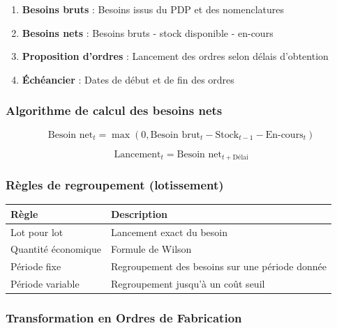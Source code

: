 \documentclass{article}
\begin{document}
\begin{table}[h]
\begin{tcolorbox}[colback=blueclair, colframe=blue!70!black, title=Principe du calcul MRP]
\begin{enumerate}
    \item \textbf{Besoins bruts} : Besoins issus du PDP et des nomenclatures
    \item \textbf{Besoins nets} : Besoins bruts - stock disponible - en-cours
    \item \textbf{Proposition d'ordres} : Lancement des ordres selon délais d'obtention
    \item \textbf{Échéancier} : Dates de début et de fin des ordres
\end{enumerate}
\end{tcolorbox}

\subsubsection{Algorithme de calcul des besoins nets}

\[
\text{Besoin net}_t = \max(0, \text{Besoin brut}_t - \text{Stock}_{t-1} - \text{En-cours}_t)
\]

\[
\text{Lancement}_t = \text{Besoin net}_{t + \text{Délai}}
\]

\subsubsection{Règles de regroupement (lotissement)}

\begin{table}[h]
\centering
\begin{tabular}{|p{}|p{}|}
\hline
\textbf{Règle} & \textbf{Description} \\
\hline
Lot pour lot & Lancement exact du besoin \\
Quantité économique & Formule de Wilson \\
Période fixe & Regroupement des besoins sur une période donnée \\
Période variable & Regroupement jusqu'à un coût seuil \\
\hline
\end{tabular}
\end{table}

\subsubsection{Transformation en Ordres de Fabrication}


\end{table}
\end{document}
